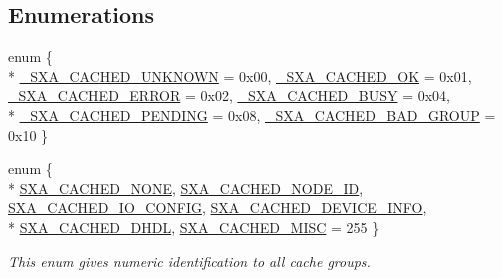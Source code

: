 \subsection*{Enumerations}
\begin{DoxyCompactItemize}
\item 
enum \{ \\*
\hyperlink{group___s_x_a_gga0411cd49bb5b71852cecd93bcbf0ca2da16320fc3c50be3823236003df46858b5}{\-\_\-\-S\-X\-A\-\_\-\-C\-A\-C\-H\-E\-D\-\_\-\-U\-N\-K\-N\-O\-W\-N} = 0x00, 
\hyperlink{group___s_x_a_gga0411cd49bb5b71852cecd93bcbf0ca2da54498f64b3ad7c2be423d32b45deac04}{\-\_\-\-S\-X\-A\-\_\-\-C\-A\-C\-H\-E\-D\-\_\-\-O\-K} = 0x01, 
\hyperlink{group___s_x_a_gga0411cd49bb5b71852cecd93bcbf0ca2da0d4d4f7cbf0ca196f444b164cb127413}{\-\_\-\-S\-X\-A\-\_\-\-C\-A\-C\-H\-E\-D\-\_\-\-E\-R\-R\-O\-R} = 0x02, 
\hyperlink{group___s_x_a_gga0411cd49bb5b71852cecd93bcbf0ca2da9f8ebeda64ea0f23a8db672978ddb13b}{\-\_\-\-S\-X\-A\-\_\-\-C\-A\-C\-H\-E\-D\-\_\-\-B\-U\-S\-Y} = 0x04, 
\\*
\hyperlink{group___s_x_a_gga0411cd49bb5b71852cecd93bcbf0ca2da17a60752eacd20e0104ef906a4960437}{\-\_\-\-S\-X\-A\-\_\-\-C\-A\-C\-H\-E\-D\-\_\-\-P\-E\-N\-D\-I\-N\-G} = 0x08, 
\hyperlink{group___s_x_a_gga0411cd49bb5b71852cecd93bcbf0ca2da7d03e78354198ea487076fa69dd2658f}{\-\_\-\-S\-X\-A\-\_\-\-C\-A\-C\-H\-E\-D\-\_\-\-B\-A\-D\-\_\-\-G\-R\-O\-U\-P} = 0x10
 \}
\item 
enum \{ \\*
\hyperlink{group___s_x_a_ggabed82baf7f470b522273a3e37c24c600ae3f816f5c71d3395d2b2c034227bf14d}{S\-X\-A\-\_\-\-C\-A\-C\-H\-E\-D\-\_\-\-N\-O\-N\-E}, 
\hyperlink{group___s_x_a_ggabed82baf7f470b522273a3e37c24c600a8d6b7f78660e6b7da06d0fa99dfb6df6}{S\-X\-A\-\_\-\-C\-A\-C\-H\-E\-D\-\_\-\-N\-O\-D\-E\-\_\-\-I\-D}, 
\hyperlink{group___s_x_a_ggabed82baf7f470b522273a3e37c24c600a8f3afd72952b8d47c03b1c9c4ea76622}{S\-X\-A\-\_\-\-C\-A\-C\-H\-E\-D\-\_\-\-I\-O\-\_\-\-C\-O\-N\-F\-I\-G}, 
\hyperlink{group___s_x_a_ggabed82baf7f470b522273a3e37c24c600a689a1dccc7c16583fec02c8d8c7ba35d}{S\-X\-A\-\_\-\-C\-A\-C\-H\-E\-D\-\_\-\-D\-E\-V\-I\-C\-E\-\_\-\-I\-N\-F\-O}, 
\\*
\hyperlink{group___s_x_a_ggabed82baf7f470b522273a3e37c24c600a0ad9240e8ef31156d92883213e899924}{S\-X\-A\-\_\-\-C\-A\-C\-H\-E\-D\-\_\-\-D\-H\-D\-L}, 
\hyperlink{group___s_x_a_ggabed82baf7f470b522273a3e37c24c600a8110f7d71f749b08814ced492ca2bd71}{S\-X\-A\-\_\-\-C\-A\-C\-H\-E\-D\-\_\-\-M\-I\-S\-C} = 255
 \}
\begin{DoxyCompactList}\small\item\em This enum gives numeric identification to all cache groups. \end{DoxyCompactList}\end{DoxyCompactItemize}
